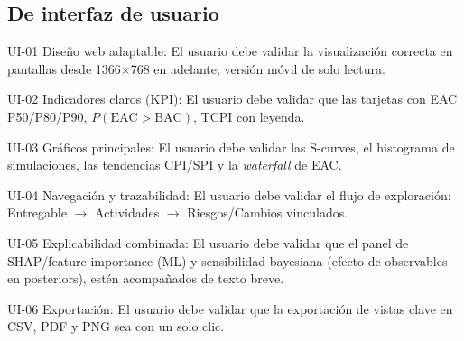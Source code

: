 \documentclass[12pt]
{charter}
\begin{document}
\subsection{De interfaz de usuario}
\begin{description}
  \item UI-01 Diseño web adaptable: El usuario debe validar la visualización correcta en pantallas desde 1366$\times$768 en adelante; versión móvil de solo lectura.

  \item UI-02 Indicadores claros (KPI): El usuario debe validar que las tarjetas con EAC P50/P80/P90, $P(\text{EAC}>\text{BAC})$, TCPI con leyenda.

  \item UI-03 Gráficos principales: El usuario debe validar las S-curves, el histograma de simulaciones, las tendencias CPI/SPI y la \textit{waterfall} de EAC.

  \item UI-04 Navegación y trazabilidad: El usuario debe validar el flujo de exploración: Entregable $\rightarrow$ Actividades $\rightarrow$ Riesgos/Cambios vinculados.

  \item UI-05 Explicabilidad combinada: El usuario debe validar que el panel de SHAP/feature importance (ML) y sensibilidad bayesiana (efecto de observables en posteriors), estén acompañados de texto breve.

   \item UI-06 Exportación: El usuario debe validar que la exportación de vistas clave en CSV, PDF y PNG sea con un solo clic.

\end{description}
\end{document}
